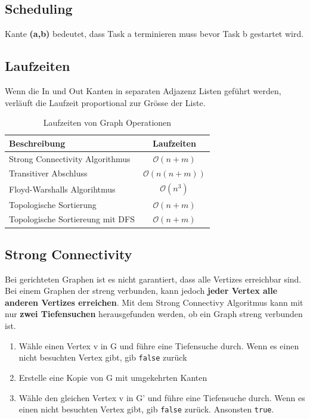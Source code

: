 \subsection{Scheduling}
Kante \textbf{(a,b)} bedeutet, dass Task a terminieren muss bevor Task b gestartet wird. 

\subsection{Laufzeiten}
Wenn die In und Out Kanten in separaten Adjazenz Listen geführt werden, verläuft die Laufzeit proportional zur Grösse der Liste.

\begin{table}[h]
	\centering
	\begin{tabu} to \linewidth {l c}
		\toprule
		Beschreibung & Laufzeiten \\
		\midrule
		Strong Connectivity Algorithmus & $\mathcal{O}(n+m)$ \\
		Transitiver Abschluss & $\mathcal{O}(n(n+m))$ \\
		Floyd-Warshalls Algorihtmus & $\mathcal{O}(n^3)$ \\
		Topologische Sortierung & $\mathcal{O}(n+m)$ \\
		Topologische Sortiereung mit DFS & $\mathcal{O}(n+m)$ \\
		\bottomrule
	\end{tabu}
	\caption{Laufzeiten von Graph Operationen}
\end{table}


\subsection{Strong Connectivity}
Bei gerichteten Graphen ist es nicht garantiert, dass alle Vertizes erreichbar sind. Bei einem Graphen der streng verbunden, kann jedoch \textbf{jeder Vertex alle anderen Vertizes erreichen}. Mit dem Strong Connectivy Algoritmus kann mit nur \textbf{zwei Tiefensuchen} herausgefunden werden, ob ein Graph streng verbunden ist. 
\begin{enumerate}
	\item Wähle einen Vertex v in G und führe eine Tiefensuche durch. Wenn es einen nicht besuchten Vertex gibt, gib \lstinline|false| zurück
	\item Erstelle eine Kopie von G mit umgekehrten Kanten
	\item Wähle den gleichen Vertex v in G' und führe eine Tiefensuche durch. Wenn es einen nicht besuchten Vertex gibt, gib \lstinline|false| zurück. Ansonsten \lstinline|true|.
\end{enumerate}

